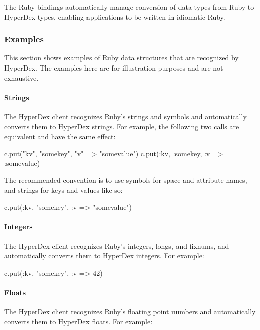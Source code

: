 The Ruby bindings automatically manage conversion of data types from Ruby to
HyperDex types, enabling applications to be written in idiomatic Ruby.

\subsubsection{Examples}
\label{sec:api:ruby:examples}

This section shows examples of Ruby data structures that are recognized by
HyperDex.  The examples here are for illustration purposes and are not
exhaustive.

\paragraph{Strings}

The HyperDex client recognizes Ruby's strings and symbols and automatically
converts them to HyperDex strings.  For example, the following two calls are
equivalent and have the same effect:

\begin{rubycode}
c.put("kv", "somekey", {"v" => "somevalue"})
c.put(:kv, :somekey, {:v => :somevalue})
\end{rubycode}

The recommended convention is to use symbols for space and attribute names, and
strings for keys and values like so:

\begin{rubycode}
c.put(:kv, "somekey", {:v => "somevalue"})
\end{rubycode}

\paragraph{Integers}

The HyperDex client recognizes Ruby's integers, longs, and fixnums, and
automatically converts them to HyperDex integers.  For example:

\begin{rubycode}
c.put(:kv, "somekey", {:v => 42})
\end{rubycode}

\paragraph{Floats}

The HyperDex client recognizes Ruby's floating point numbers and automatically
converts them to HyperDex floats.  For example:

